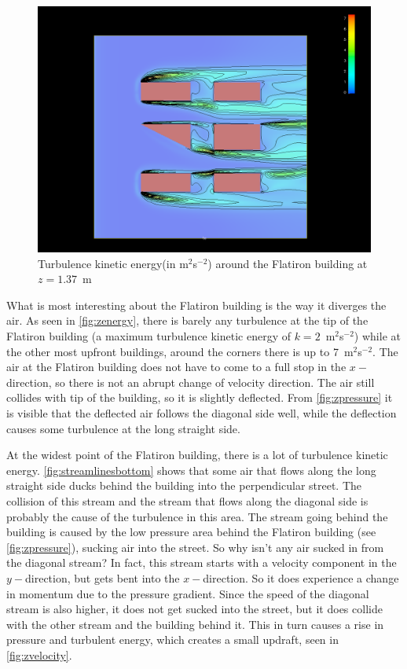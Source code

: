 \begin{figure}[htp]
\centering
\includegraphics[width = \textwidth]{zenergy.png}
\caption{Turbulence kinetic energy(in m$^2$s$^{-2}$) around the Flatiron building at $z=1.37$~m}
\label{fig:zenergy}
\end{figure}

What is most interesting about the Flatiron building is the way it diverges the air. As seen in \autoref{fig:zenergy}, there is barely any turbulence at the tip of the Flatiron building (a maximum turbulence kinetic energy of $k=2$~m$^2$s$^{-2}$) while at the other most upfront buildings, around the corners there is up to 7~m$^2$s$^{-2}$. The air at the Flatiron building does not have to come to a full stop in the $x-$direction, so there is not an abrupt change of velocity direction. The air still collides with tip of the building, so it is slightly deflected. From \autoref{fig:zpressure} it is visible that the deflected air follows the diagonal side well, while the deflection causes some turbulence at the long straight side. 

At the widest point of the Flatiron building, there is a lot of turbulence kinetic energy. \autoref{fig:streamlinesbottom} shows that some air that flows along the long straight side ducks behind the building into the perpendicular street. The collision of this stream and the stream that flows along the diagonal side is probably the cause of the turbulence in this area. The stream going behind the building is caused by the low pressure area behind the Flatiron building (see \autoref{fig:zpressure}), sucking air into the street. So why isn't any air sucked in from the diagonal stream? In fact, this stream starts with a velocity component in the $y-$direction, but gets bent into the $x-$direction. So it does experience a change in momentum due to the pressure gradient. Since the speed of the diagonal stream is also higher, it does not get sucked into the street, but it does collide with the other stream and the building behind it. This in turn causes a rise in pressure and turbulent energy, which creates a small updraft, seen in \autoref{fig:zvelocity}. 